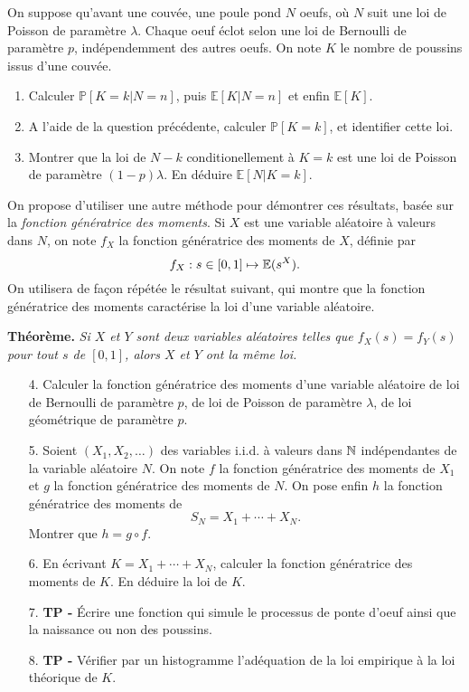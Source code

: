 \documentclass[solutions]{exercices}
\begin{document}
\begin{exercice}
	On suppose qu'avant une couvée, une poule pond $N$ oeufs, où $N$ suit une loi de Poisson de paramètre $\lambda$. Chaque oeuf éclot selon une loi de Bernoulli de paramètre $p$, indépendemment des autres oeufs. On note $K$ le nombre de poussins issus d'une couvée.
	\begin{enumerate}
		\item  Calculer $\mathbb{P}[K=k|N=n]$, puis $\mathbb{E}[K|N=n]$ et enfin $\mathbb{E}[K]$.
		\item  A l'aide de la question précédente, calculer $\mathbb{P}[K=k]$, et identifier cette loi.
		\item  Montrer que la loi de $N-k$ conditionellement à $K=k$ est une loi de Poisson de paramètre $(1-p)\lambda$. En déduire $\mathbb{E}[N|K=k]$.
	\end{enumerate}

	On propose d'utiliser une autre méthode pour démontrer ces résultats, basée sur la \emph{fonction génératrice des moments}. Si $X$ est une variable aléatoire à valeurs dans $N$, on note $f_X$ la fonction génératrice des moments de $X$, définie par
	\[
		f_X : s \in [0,1] \mapsto \mathbb{E}(s^X).
	\]
	On utilisera de façon répétée le résultat suivant, qui montre que la fonction génératrice des moments caractérise la loi d'une variable aléatoire.

	\textbf{Théorème.}
	\emph{Si $X$ et $Y$ sont deux variables aléatoires telles que $f_X(s) = f_Y(s)$ pour tout $s$ de $[0,1]$, alors $X$ et $Y$ ont la même loi.}

	\begin{enumerate}
		\item[4.] Calculer la fonction génératrice des moments d'une variable aléatoire de loi de Bernoulli de paramètre $p$, de loi de Poisson de paramètre $\lambda$, de loi géométrique de paramètre $p$.
		\item[5.] Soient $(X_1,X_2,\ldots)$ des variables i.i.d. à valeurs dans $\mathbb{N}$ indépendantes de la variable aléatoire $N$. On note $f$ la fonction génératrice des moments de $X_1$ et $g$ la fonction génératrice des moments de $N$. On pose enfin $h$ la fonction génératrice des moments de
		      \[
			      S_N = X_1 + \cdots + X_N.
		      \]
		      Montrer que $h = g \circ f$.
		\item[6.] En écrivant $K = X_1 + \cdots + X_N$, calculer la fonction génératrice des moments de $K$. En déduire la loi de $K$.
		\item[7.]\textbf{TP - } Écrire une fonction qui simule le processus de ponte d’oeuf ainsi que la naissance ou non des poussins.
		\item[8.]\textbf{TP - }  Vérifier par un histogramme l'adéquation de la loi empirique à la loi théorique de $K$.
	\end{enumerate}
\end{exercice}
\end{document}
